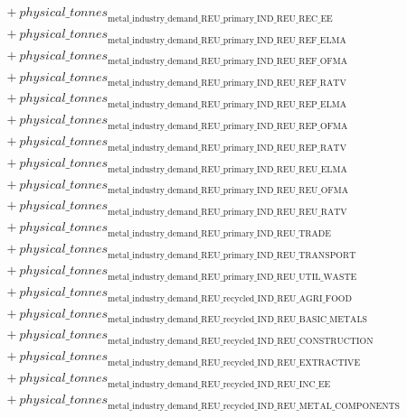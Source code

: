 \documentclass[11pt]{article}
\begin{document}
\begin{align*}
&\quad {}+ {physical\_tonnes}_{\text{metal\_industry\_demand\_REU\_primary\_IND\_REU\_REC\_EE}}\\
&\quad {}+ {physical\_tonnes}_{\text{metal\_industry\_demand\_REU\_primary\_IND\_REU\_REF\_ELMA}}\\
&\quad {}+ {physical\_tonnes}_{\text{metal\_industry\_demand\_REU\_primary\_IND\_REU\_REF\_OFMA}}\\
&\quad {}+ {physical\_tonnes}_{\text{metal\_industry\_demand\_REU\_primary\_IND\_REU\_REF\_RATV}}\\
&\quad {}+ {physical\_tonnes}_{\text{metal\_industry\_demand\_REU\_primary\_IND\_REU\_REP\_ELMA}}\\
&\quad {}+ {physical\_tonnes}_{\text{metal\_industry\_demand\_REU\_primary\_IND\_REU\_REP\_OFMA}}\\
&\quad {}+ {physical\_tonnes}_{\text{metal\_industry\_demand\_REU\_primary\_IND\_REU\_REP\_RATV}}\\
&\quad {}+ {physical\_tonnes}_{\text{metal\_industry\_demand\_REU\_primary\_IND\_REU\_REU\_ELMA}}\\
&\quad {}+ {physical\_tonnes}_{\text{metal\_industry\_demand\_REU\_primary\_IND\_REU\_REU\_OFMA}}\\
&\quad {}+ {physical\_tonnes}_{\text{metal\_industry\_demand\_REU\_primary\_IND\_REU\_REU\_RATV}}\\
&\quad {}+ {physical\_tonnes}_{\text{metal\_industry\_demand\_REU\_primary\_IND\_REU\_TRADE}}\\
&\quad {}+ {physical\_tonnes}_{\text{metal\_industry\_demand\_REU\_primary\_IND\_REU\_TRANSPORT}}\\
&\quad {}+ {physical\_tonnes}_{\text{metal\_industry\_demand\_REU\_primary\_IND\_REU\_UTIL\_WASTE}}\\
&\quad {}+ {physical\_tonnes}_{\text{metal\_industry\_demand\_REU\_recycled\_IND\_REU\_AGRI\_FOOD}}\\
&\quad {}+ {physical\_tonnes}_{\text{metal\_industry\_demand\_REU\_recycled\_IND\_REU\_BASIC\_METALS}}\\
&\quad {}+ {physical\_tonnes}_{\text{metal\_industry\_demand\_REU\_recycled\_IND\_REU\_CONSTRUCTION}}\\
&\quad {}+ {physical\_tonnes}_{\text{metal\_industry\_demand\_REU\_recycled\_IND\_REU\_EXTRACTIVE}}\\
&\quad {}+ {physical\_tonnes}_{\text{metal\_industry\_demand\_REU\_recycled\_IND\_REU\_INC\_EE}}\\
&\quad {}+ {physical\_tonnes}_{\text{metal\_industry\_demand\_REU\_recycled\_IND\_REU\_METAL\_COMPONENTS}}\\

\end{align*}
\end{document}
